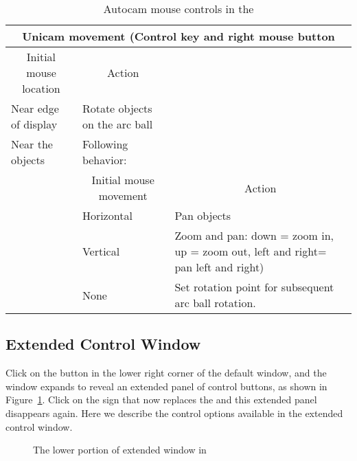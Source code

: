 \begin{table}
\begin{center}
\begin{tabular}{|l|l|p{3in}|} \hline
    \multicolumn{3}{|c|}{\large Unicam movement (Control key and right mouse
    button} \\ \hline \hline
    \multicolumn{1}{|c|}{Initial mouse location} & 
    \multicolumn{1}{|c|}{Action} & \\ 
    \hline
    Near edge of display & Rotate objects on the arc ball & \\
    Near the objects & Following behavior: & \\
    \hline
    & \multicolumn{1}{|c|}{Initial mouse movement} & 
    \multicolumn{1}{|c|}{Action}\\ \hline
    & Horizontal & Pan objects \\ 
    & Vertical & Zoom and pan: down = zoom in, up = zoom
    out, left and right= pan left and right) \\
    & None & Set rotation point for subsequent arc ball rotation.\\
    \hline
\end{tabular}
\caption{\label{tab:view-unicam} Autocam mouse controls in the \viewer{}}
\end{center}
\end{table}



\subsection{Extended Control Window}
\label{sec:view-control} 

Click on the \button{[+]} button in the lower right corner of the
default \viewer{} window, and the window expands to reveal an extended
panel of control buttons, as shown in Figure~\ref{fig:extviewwindow}.
Click on the \button{[-]} sign that now replaces the \button{[+]} and
this extended panel disappears again.  Here we describe the control
options available in the extended control window.

\begin{figure}[htb]
  \begin{makeimage}
  \end{makeimage}
  \extendedwindow
  \caption{\label{fig:extviewwindow} The lower portion of extended
    \viewer{} window in \SR{}} 
\end{figure}


